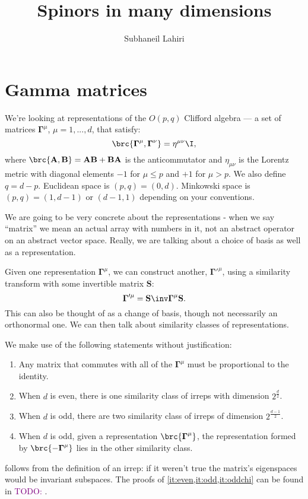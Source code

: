 \documentclass[11pt]{article}
\newcommand{\todo}[1]{\textcolor{purple}{TODO: #1}}
\newcommand{\Gammab}{\boldsymbol{\Gamma}}
\renewcommand{\S}{\mathbf{S}}
\newcommand{\A}{\mathbf{A}}
\newcommand{\B}{\mathbf{B}}
\begin{document}
\title{Spinors in many dimensions}
\author{Subhaneil Lahiri}
\date{}
\maketitle
\tableofcontents
\section{Gamma matrices}\label{sec:clifford}

We're looking at representations of the $O(p,q)$ Clifford algebra --- a set of matrices $\Gammab^\mu$, $\mu = 1, ..., d$, that satisfy:
%
\begin{equation}\label{eq:clifford}
  \brc{ \Gammab^\mu, \Gammab^\nu } = \eta^{\mu\nu} \I,
\end{equation}
%
where $\brc{ \A, \B } = \A\B + \B\A$ is the anticommutator and $\eta_{\mu\nu}$ is the Lorentz metric with diagonal elements $-1$ for $\mu \leq p$ and $+1$ for $\mu > p$. We also define $q = d - p$.
Euclidean space is \( (p,q) = (0,d) \).
Minkowski space is \( (p,q) = (1,d-1) \) or \( (d-1,1) \) depending on your conventions.

We are going to be very concrete about the representations - when we say ``matrix'' we mean an actual array with numbers in it, not an abstract operator on an abstract vector space.
Really, we are talking about a choice of basis as well as a representation.

Given one representation $\Gammab^\mu$, we can construct another, $\Gammab'^{\mu}$, using a similarity transform with some invertible matrix $\S$:
%
\begin{equation}\label{eq:similarity}
  \Gammab'^{\mu} = \S\inv \Gammab^\mu \S.
\end{equation}
%
This can also be thought of as a change of basis, though not necessarily an orthonormal one.
We can then talk about similarity classes of representations.

We make use of the following statements without justification:
%
\begin{enumerate}
  \item Any matrix that commutes with all of the $\Gammab^\mu$ must be proportional to the identity.
      \label{it:commute}
  \item When $d$ is even, there is one similarity class of irreps with dimension $2^{\frac{d}{2}}$.
      \label{it:even}
  \item When $d$ is odd, there are two similarity class of irreps of dimension $2^{\frac{d-1}{2}}$.
      \label{it:odd}
  \item When $d$ is odd, given a representation $\brc{\Gammab^\mu}$, the representation formed by $\brc{ -\Gammab^\mu }$ lies in the other similarity class.
      \label{it:oddchi}
\end{enumerate}
%
 follows from the definition of an irrep: if it weren't true the matrix's eigenspaces would be invariant subspaces.
The proofs of \cref{it:even,it:odd,it:oddchi} can be found in \todo{}.
\end{document}
